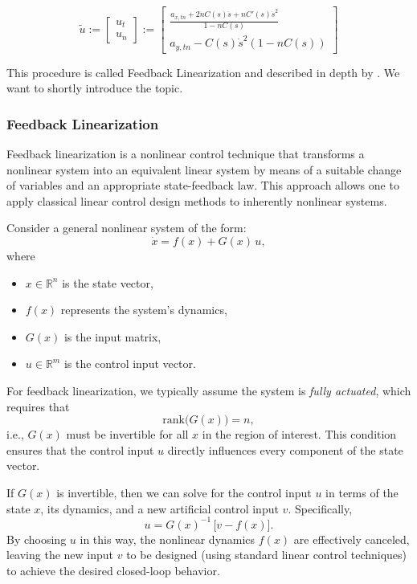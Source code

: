 \begin{equation}
	\label{eq:artificial_controls}
	\tilde{u} := \begin{bmatrix}
		u_t \\
		u_n
	\end{bmatrix} := \begin{bmatrix}
		\frac{a_{x,tn} + 2\dot{n}
		C(s)\dot{s}+nC'(s)\dot{s}^2} { 1-nC(s) } \\ a_{y,tn} - C(s)\dot{s}^2(1-nC(s))\end{bmatrix} \end{equation}

This procedure is
called Feedback Linearization and described in depth by \cite{khalil_nonlinear_2002}.
We want to shortly introduce the topic.

\subsubsection{Feedback Linearization}

Feedback linearization is a nonlinear control technique that transforms a nonlinear system into an equivalent linear system by means of a suitable
change of variables and an appropriate state-feedback law.
This approach allows one to apply classical linear control design methods to inherently nonlinear systems.

Consider a general nonlinear system of the form:
\begin{equation}
	\dot{x} = f(x) + G(x)\,u,
\end{equation}
where
\begin{itemize}
	\item $x \in \mathbb{R}^n$ is the state vector,
	\item $f(x)$ represents the system's dynamics,
	\item $G(x)$ is the input matrix,
	\item $u \in \mathbb{R}^m$ is the control input vector.
\end{itemize}

For feedback linearization, we typically assume the system is \emph{fully actuated}, which requires that \[ \text{rank}\bigl(G(x)\bigr) = n, \] i.e.,
$G(x)$ must be invertible for all $x$ in the region of interest.
This condition ensures that the control input $u$ directly influences every component of the state vector.

If $G(x)$ is invertible, then we can solve for the control input $u$ in terms of the state $x$, its dynamics, and a new artificial control input $v$.
Specifically,
\begin{equation}
	u = G(x)^{-1}\,\bigl[v - f(x)\bigr].
\end{equation}
By choosing $u$ in this way, the nonlinear dynamics $f(x)$ are effectively canceled, leaving the new input $v$ to be designed (using standard linear
control techniques) to achieve the desired closed-loop behavior.

